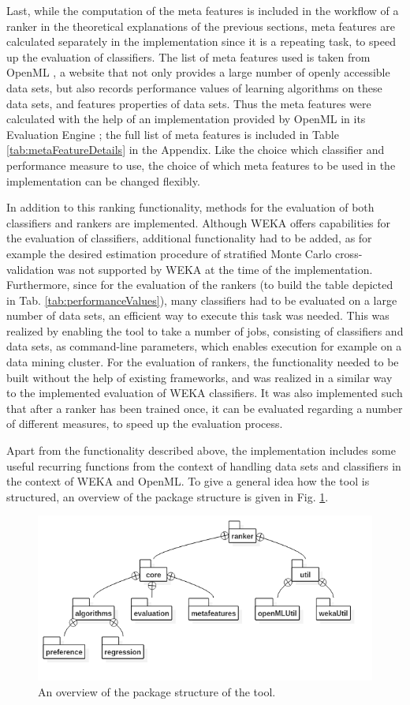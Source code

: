 Last, while the computation of the meta features is included in the workflow of a ranker in the theoretical explanations of the previous sections, meta features are calculated separately in the implementation since it is a repeating task, to speed up the evaluation of classifiers. The list of meta features used is taken from OpenML \cite{OpenML2013}, a website that not only provides a large number of openly accessible data sets, but also records performance values of learning algorithms on these data sets, and features properties of data sets. Thus the meta features were calculated with the help of an implementation provided by OpenML in its Evaluation Engine \cite{openMLEvaluationEngine}; the full list of meta features is included in Table \ref{tab:metaFeatureDetails} in the Appendix. Like the choice which classifier and performance measure to use, the choice of which meta features to be used in the implementation can be changed flexibly.

In addition to this ranking functionality, methods for the evaluation of both classifiers and rankers are implemented. Although WEKA offers capabilities for the evaluation of classifiers, additional functionality had to be added, as for example the desired estimation procedure of stratified Monte Carlo cross-validation was not supported by WEKA at the time of the implementation. Furthermore, since for the evaluation of the rankers (to build the table depicted in Tab. \ref{tab:performanceValues}), many classifiers had to be evaluated on a large number of data sets, an efficient way to execute this task was needed. This was realized by enabling the tool to take a number of jobs, consisting of classifiers and data sets, as command-line parameters, which enables execution for example on a data mining cluster. For the evaluation of rankers, the functionality needed to be built without the help of existing frameworks, and was realized in a similar way to the implemented evaluation of WEKA classifiers. It was also implemented such that after a ranker has been trained once, it can be evaluated regarding a number of different measures, to speed up the evaluation process.

Apart from the functionality described above, the implementation includes some useful recurring functions from the context of handling data sets and classifiers in the context of WEKA and OpenML. To give a general idea how the tool is structured, an overview of the package structure is given in Fig. \ref{fig:package_overview}.

\begin{figure}
\includegraphics[width=\textwidth]{gfx/Package_Structure.png}
\caption{An overview of the package structure of the tool.}
\label{fig:package_overview}
\end{figure}
